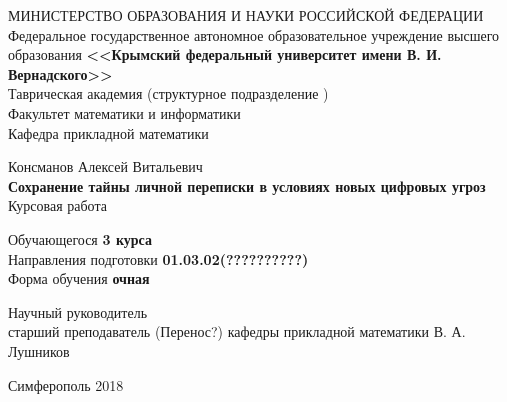      \begin{titlepage}
    \newpage
	\pagestyle{empty} %
    \begin{center}
    \normalsize МИНИСТЕРСТВО ОБРАЗОВАНИЯ И НАУКИ РОССИЙСКОЙ ФЕДЕРАЦИИ\\ 
    \small  {Федеральное государственное автономное образовательное учреждение высшего образования} 
    \large \textbf{<<Крымский  федеральный  университет имени В. И. Вернадского>>} \\  \vspace{2mm}
    Таврическая академия (структурное подразделение ) \\
    \vspace{2mm}
    Факультет математики и информатики \\
    \vspace{2mm}
    Кафедра прикладной математики 
    \end{center}
    \vspace{3em}

    \begin{center}
	\normalsize Консманов Алексей Витальевич \\
    \LARGE \textbf{Сохранение тайны личной переписки в условиях новых цифровых угроз} \\
    \vspace{1em}
    \normalsize Курсовая работа 
    \end{center}

    \vspace{1em}
    
    \begin{center}
    	\begin{tabbing}	%
    		\hspace{3cm}Обучающегося \hspace{3cm} \textbf{3 курса}\\ %
    		\hspace{3cm}Направления подготовки \hspace{1cm}  \textbf{01.03.02(??????????)}\\
    		\hspace{3cm}Форма обучения \hspace{26mm} \textbf{очная}
    	\end{tabbing}
    
	\vspace {3em}
    \flushleft Научный руководитель \\ старший преподаватель (Перенос?) кафедры прикладной математики \quad В. А. Лушников
	\end{center}
    \vspace{\fill}

    \begin{center}
    Симферополь 2018
    \end{center}

    \end{titlepage}